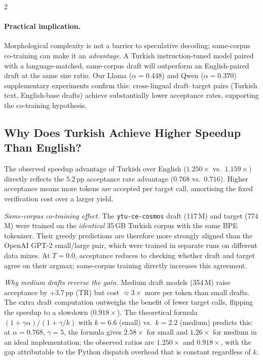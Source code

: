 \documentclass[11pt,a4paper]{article}
\begin{document}
\begin{multicols}{2}
\paragraph{Practical implication.}
Morphological complexity is not a barrier to speculative decoding;
same-corpus co-training can make it an \emph{advantage}.
A Turkish instruction-tuned model paired with a language-matched,
same-corpus draft will outperform an English-paired draft at the same
size ratio.
Our Llama ($\alpha=0.448$) and Qwen ($\alpha=0.370$) supplementary
experiments confirm this: cross-lingual draft--target pairs (Turkish
text, English-base drafts) achieve substantially lower acceptance rates,
supporting the co-training hypothesis.

\subsection{Why Does Turkish Achieve Higher Speedup Than English?}
\label{sec:disc-speedup}

The observed speedup advantage of Turkish over English ($1.250\!\times$
vs.\ $1.159\!\times$) directly reflects the $5.2$\,pp acceptance rate
advantage ($0.768$ vs.\ $0.716$).
Higher acceptance means more tokens are accepted per target call,
amortising the fixed verification cost over a larger yield.

\textit{Same-corpus co-training effect.}
The \texttt{ytu-ce-cosmos} draft (117\,M) and target (774\,M) were
trained on the \emph{identical} 35\,GB Turkish corpus with the same BPE
tokenizer.
Their greedy predictions are therefore more strongly aligned than the
OpenAI GPT-2 small/large pair, which were trained in separate runs on
different data mixes.
At $T=0.0$, acceptance reduces to checking whether draft and target agree
on their argmax; same-corpus training directly increases this agreement.

\textit{Why medium drafts reverse the gain.}
Medium draft models (354\,M) raise acceptance by $+3.7$\,pp (TR) but
cost ${\approx}3\!\times$ more per token than small drafts.
The extra draft computation outweighs the benefit of fewer target calls,
flipping the speedup to a slowdown ($0.918\!\times$).
The theoretical formula $(1+\gamma\alpha)/(1+\gamma/k)$ with $k=6.6$
(small) vs.\ $k=2.2$ (medium) predicts this: at $\alpha=0.768$,
$\gamma=5$, the formula gives $2.58\!\times$ for small and $1.26\!\times$
for medium in an ideal implementation; the observed ratios are
$1.250\!\times$ and $0.918\!\times$, with the gap attributable to
the Python dispatch overhead that is constant regardless of $k$.


\end{multicols}
\end{document}
